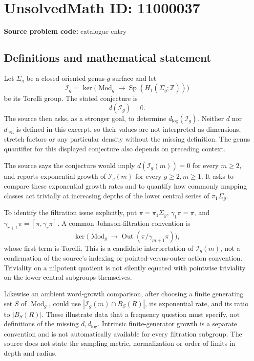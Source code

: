 \documentclass[11pt]{article}
\newcommand{\Z}{\mathbb{Z}}
\begin{document}
\section*{UnsolvedMath ID: 11000037}
\textbf{Source problem code:} catalogue entry
\subsection{Definitions and mathematical statement}
Let \(\Sigma_g\) be a closed oriented genus-\(g\) surface and let
\[\mathcal I_g=\ker\bigl(\operatorname{Mod}_g\to\operatorname{Sp}(H_1(\Sigma_g;\Z))\bigr)\]
be its Torelli group. The stated conjecture is
\[d(\mathcal I_g)=0.\]
The source then asks, as a stronger goal, to determine \(d_{\log}(\mathcal I_g)\). Neither \(d\) nor \(d_{\log}\) is defined in this excerpt, so their values are not interpreted as dimensions, stretch factors or any particular density without the missing definition. The genus quantifier for this displayed conjecture also depends on preceding context.

The source says the conjecture would imply \(d(\mathcal I_g(m))=0\) for every \(m\geq2\), and reports exponential growth of \(\mathcal I_g(m)\) for every \(g\geq2,m\geq1\). It asks to compare these exponential growth rates and to quantify how commonly mapping classes act trivially at increasing depths of the lower central series of \(\pi_1\Sigma_g\).

To identify the filtration issue explicitly, put \(\pi=\pi_1\Sigma_g\), \(\gamma_1\pi=\pi\), and \(\gamma_{r+1}\pi=[\pi,\gamma_r\pi]\). A common Johnson-filtration convention is
\[\ker\bigl(\operatorname{Mod}_g\to\operatorname{Out}(\pi/\gamma_{m+1}\pi)\bigr),\]
whose first term is Torelli. This is a candidate interpretation of \(\mathcal I_g(m)\), not a confirmation of the source's indexing or pointed-versus-outer action convention. Triviality on a nilpotent quotient is not silently equated with pointwise triviality on the lower-central subgroups themselves.

Likewise an ambient word-growth comparison, after choosing a finite generating set \(S\) of \(\operatorname{Mod}_g\), could use \(|\mathcal I_g(m)\cap B_S(R)|\), its exponential rate, and its ratio to \(|B_S(R)|\). These illustrate data that a frequency question must specify, not definitions of the missing \(d,d_{\log}\). Intrinsic finite-generator growth is a separate convention and is not automatically available for every filtration subgroup. The source does not state the sampling metric, normalization or order of limits in depth and radius.
\end{document}
